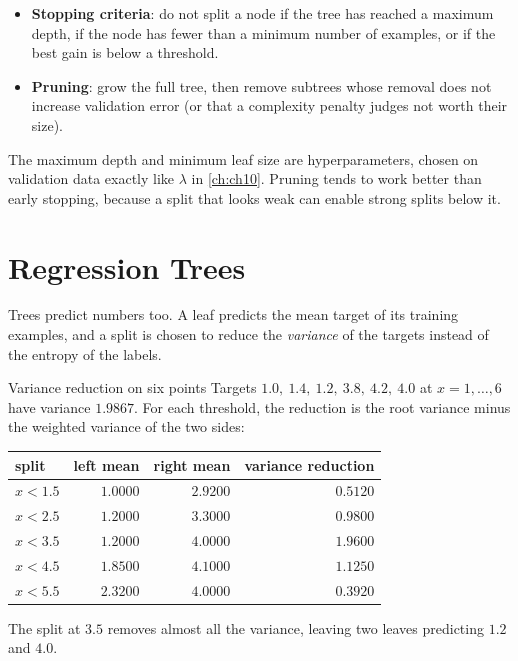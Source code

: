 \begin{itemize}
  \item \textbf{Stopping criteria}: do not split a node if the tree has reached a
        maximum depth, if the node has fewer than a minimum number of examples,
        or if the best gain is below a threshold.
  \item \textbf{Pruning}: grow the full tree, then remove subtrees whose removal
        does not increase validation error (or that a complexity penalty judges
        not worth their size).
\end{itemize}

The maximum depth and minimum leaf size are hyperparameters, chosen on
validation data exactly like $\lambda$ in \cref{ch:ch10}. Pruning tends to work
better than early stopping, because a split that looks weak can enable strong
splits below it.

\section{Regression Trees}
\label{sec:regression-trees}

Trees predict numbers too. A leaf predicts the mean target of its training
examples, and a split is chosen to reduce the \emph{variance} of the targets
instead of the entropy of the labels.

\begin{workedexample}{Variance reduction on six points}
Targets $1.0,\ 1.4,\ 1.2,\ 3.8,\ 4.2,\ 4.0$ at $x = 1,\dots,6$ have variance
$1.9867$. For each threshold, the reduction is the root variance minus the
weighted variance of the two sides:

\begin{center}
\small
\renewcommand{\arraystretch}{1.12}
\begin{tabular}{@{}lrrr@{}}
\toprule
split & left mean & right mean & variance reduction\\
\midrule
$x < 1.5$ & $1.0000$ & $2.9200$ & $0.5120$\\
$x < 2.5$ & $1.2000$ & $3.3000$ & $0.9800$\\
$x < 3.5$ & $1.2000$ & $4.0000$ & $\mathbf{1.9600}$\\
$x < 4.5$ & $1.8500$ & $4.1000$ & $1.1250$\\
$x < 5.5$ & $2.3200$ & $4.0000$ & $0.3920$\\
\bottomrule
\end{tabular}
\end{center}

The split at $3.5$ removes almost all the variance, leaving two leaves
predicting $1.2$ and $4.0$.
\end{workedexample}

